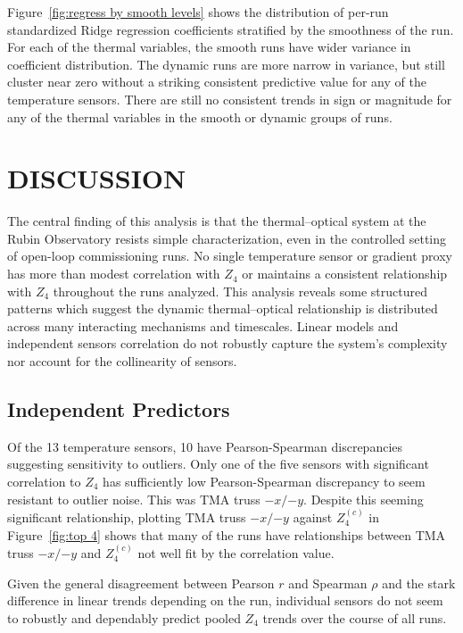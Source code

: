 \documentclass[SE,authoryear,toc]{lsstdoc}
\begin{document}
Figure~\ref{fig:regress by smooth levels} shows the distribution of per-run standardized Ridge regression coefficients stratified by the smoothness of the run. For each of the thermal variables, the smooth runs have wider variance in coefficient distribution. The dynamic runs are more narrow in variance, but still cluster near zero without a striking consistent predictive value for any of the temperature sensors. There are still no consistent trends in sign or magnitude for any of the thermal variables in the smooth or dynamic groups of runs. 

\section{DISCUSSION}
\label{sec: Discussion}

The central finding of this analysis is that the thermal--optical system at the Rubin Observatory resists simple characterization, even in the controlled setting of open-loop commissioning runs. No single temperature sensor or gradient proxy has more than modest correlation with $Z_4$ or maintains a consistent relationship with $Z_4$ throughout the runs analyzed. This analysis reveals some structured patterns which suggest the dynamic thermal--optical relationship is distributed across many interacting mechanisms and timescales. Linear models and independent sensors correlation do not robustly capture the system's complexity nor account for the collinearity of sensors. 

\subsection{Independent Predictors}

Of the 13 temperature sensors, 10 have Pearson-Spearman discrepancies suggesting sensitivity to outliers. Only one of the five sensors with significant correlation to $Z_4$ has sufficiently low Pearson-Spearman discrepancy to seem resistant to outlier noise. This was TMA truss $-x/{-y}$. Despite this seeming significant relationship, plotting TMA truss $-x/{-y}$ against $Z_4^{(c)}$ in Figure~\ref{fig:top 4} shows that many of the runs have relationships between TMA truss $-x/{-y}$ and $Z_4^{(c)}$ not well fit by the correlation value.

Given the general disagreement between Pearson $r$ and Spearman $\rho$ and the stark difference in linear trends depending on the run, individual sensors do not seem to robustly and dependably predict pooled $Z_4$ trends over the course of all runs. 
\end{document}
